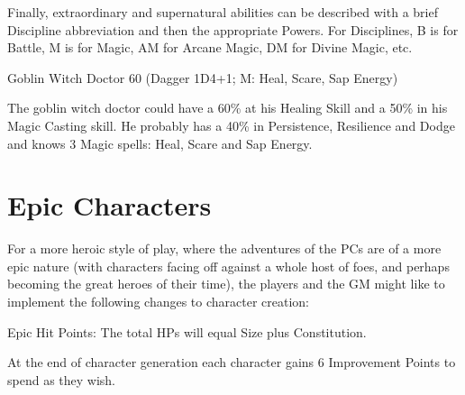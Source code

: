 Finally, extraordinary and supernatural abilities can be described with a brief Discipline abbreviation and then the appropriate Powers. For Disciplines, B is for Battle, M is for Magic, AM for Arcane Magic, DM for Divine Magic, etc.

\begin{rpg-examplebox}
Goblin Witch Doctor 60 (Dagger 1D4+1; M: Heal, Scare, Sap Energy)
\end{rpg-examplebox}

The goblin witch doctor could have a 60\% at his Healing Skill and a 50\% in his Magic Casting skill. He probably has a 40\% in Persistence, Resilience and Dodge and knows 3 Magic spells: Heal, Scare and Sap Energy.


\section{Epic Characters}
For a more heroic style of play, where the adventures of the PCs are of a more epic nature (with characters facing off against a whole host of foes, and perhaps becoming the great heroes of their time), the players and the GM might like to implement the following changes to character creation:

\begin{rpg-list}
	\item Epic Hit Points: The total HPs will equal Size plus Constitution.
	\item At the end of character generation each character gains 6 Improvement Points to spend as they wish.
\end{rpg-list}

